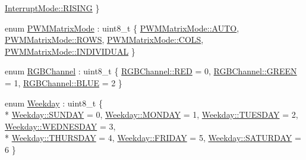 \begin{DoxyCompactItemize}
\hyperlink{namespaceflame_a698b7769e19483fd6d866160b5e62f09ab3762d500f2ada6030da058853c195d6}{Interrupt\-Mode\-::\-R\-I\-S\-I\-N\-G}
 \}
\item 
enum \hyperlink{namespaceflame_aa50d24261454452fef6df853a10b8d9a}{P\-W\-M\-Matrix\-Mode} \-: uint8\-\_\-t \{ \hyperlink{namespaceflame_aa50d24261454452fef6df853a10b8d9aae1f2d5134ed2543d38a0de9751cf75d9}{P\-W\-M\-Matrix\-Mode\-::\-A\-U\-T\-O}, 
\hyperlink{namespaceflame_aa50d24261454452fef6df853a10b8d9aace4aae3bd64ecf94981ad98294919a63}{P\-W\-M\-Matrix\-Mode\-::\-R\-O\-W\-S}, 
\hyperlink{namespaceflame_aa50d24261454452fef6df853a10b8d9aa54c65a028ff224383655adab430d6741}{P\-W\-M\-Matrix\-Mode\-::\-C\-O\-L\-S}, 
\hyperlink{namespaceflame_aa50d24261454452fef6df853a10b8d9aa938873bbf7fe69b2f3836e6103f2a323}{P\-W\-M\-Matrix\-Mode\-::\-I\-N\-D\-I\-V\-I\-D\-U\-A\-L}
 \}
\item 
enum \hyperlink{namespaceflame_a47f12f0248f648dbdbfa6fe26d79028d}{R\-G\-B\-Channel} \-: uint8\-\_\-t \{ \hyperlink{namespaceflame_a47f12f0248f648dbdbfa6fe26d79028daa2d9547b5d3dd9f05984475f7c926da0}{R\-G\-B\-Channel\-::\-R\-E\-D} = 0, 
\hyperlink{namespaceflame_a47f12f0248f648dbdbfa6fe26d79028da9de0e5dd94e861317e74964bed179fa0}{R\-G\-B\-Channel\-::\-G\-R\-E\-E\-N} = 1, 
\hyperlink{namespaceflame_a47f12f0248f648dbdbfa6fe26d79028da1b3e1ee9bff86431dea6b181365ba65f}{R\-G\-B\-Channel\-::\-B\-L\-U\-E} = 2
 \}
\item 
enum \hyperlink{namespaceflame_a9e91c049f07e339f96e049afde92bcdc}{Weekday} \-: uint8\-\_\-t \{ \\*
\hyperlink{namespaceflame_a9e91c049f07e339f96e049afde92bcdca95fa12cb2100ce7081b71f7c44bc12a5}{Weekday\-::\-S\-U\-N\-D\-A\-Y} = 0, 
\hyperlink{namespaceflame_a9e91c049f07e339f96e049afde92bcdca98617021b249af0ace0f84ee92ccc7cd}{Weekday\-::\-M\-O\-N\-D\-A\-Y} = 1, 
\hyperlink{namespaceflame_a9e91c049f07e339f96e049afde92bcdca5f5140afce13197a89e848004f292f14}{Weekday\-::\-T\-U\-E\-S\-D\-A\-Y} = 2, 
\hyperlink{namespaceflame_a9e91c049f07e339f96e049afde92bcdcaaaebdc947e9f7d4ea362e5dc4fe7f825}{Weekday\-::\-W\-E\-D\-N\-E\-S\-D\-A\-Y} = 3, 
\\*
\hyperlink{namespaceflame_a9e91c049f07e339f96e049afde92bcdca7a61b324afb4dd8b2fb4a38afc34f755}{Weekday\-::\-T\-H\-U\-R\-S\-D\-A\-Y} = 4, 
\hyperlink{namespaceflame_a9e91c049f07e339f96e049afde92bcdca86fb6d343289267f3e9edb9b7403d936}{Weekday\-::\-F\-R\-I\-D\-A\-Y} = 5, 
\hyperlink{namespaceflame_a9e91c049f07e339f96e049afde92bcdcafd5ae113ac00b67f69541bc8c7f21ef7}{Weekday\-::\-S\-A\-T\-U\-R\-D\-A\-Y} = 6
 \}
\item 

\end{DoxyCompactItemize}
